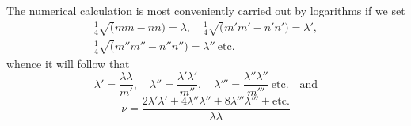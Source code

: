 \par The numerical calculation is most conveniently carried out by logarithms if we set
\[
\begin{gathered}\tfrac14\surd(mm-nn)=\lambda,\quad\tfrac14\surd(m'm'-n'n')=\lambda',\\[6pt]\tfrac14\surd(m''m''-n''n'')=\lambda''\ \mathrm{etc.}\end{gathered}
\]
whence it will follow that
\[
\lambda'=\frac{\lambda\lambda}{m'},\quad
\lambda''=\frac{\lambda'\lambda'}{m''},\quad
\lambda'''=\frac{\lambda''\lambda''}{m'''}\ \mathrm{etc.}\quad\text{and}
\]
\[
\nu=\frac{2\lambda'\lambda'+4\lambda''\lambda''+8\lambda'''\lambda'''+\mathrm{etc.}}{\lambda\lambda}
\]

\clearpage
\endgroup
